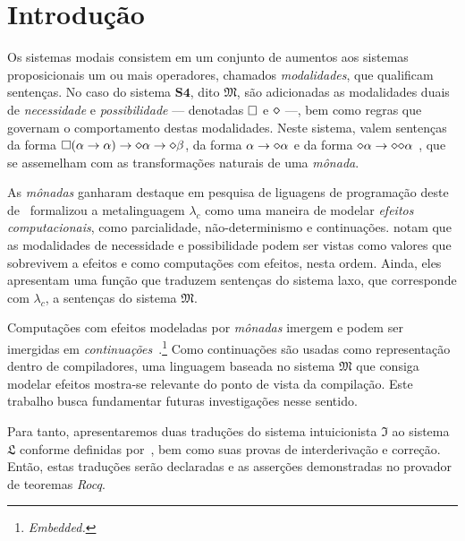 \chapter{Introdução}

    Os sistemas modais consistem em um conjunto de aumentos aos sistemas proposicionais um ou mais operadores, chamados \emph{modalidades}, que qualificam sentenças.
    No caso do sistema $\mathbf{S4}$, dito $\mathfrak{M}$, são adicionadas as modalidades duais de \emph{necessidade} e \emph{possibilidade} --- denotadas $\Box$ e $\pos$ ---, bem como regras que governam o comportamento destas modalidades.
    Neste sistema, valem sentenças da forma $\nec(\alpha\to\alpha)\to\pos\alpha\to\pos\beta$, da forma $\alpha\to\pos\alpha$ e da forma $\pos\alpha\to\pos\pos\alpha$ \citep{Zach+others.2024}, que se assemelham com as transformações naturais de uma \emph{mônada}.

    \vspace{.5\baselineskip}
    As \emph{mônadas} ganharam destaque em pesquisa de liguagens de programação deste de~\cite{Moggi.1991} formalizou a metalinguagem $\lambda_c$ como uma maneira de modelar \emph{efeitos computacionais}, como parcialidade, não-determinismo e continuações.
    \cite{Pfenning+Davies.2001} notam que as modalidades de necessidade e possibilidade podem ser vistas como valores que sobrevivem a efeitos e como computações com efeitos, nesta ordem.
    Ainda, eles apresentam uma função que traduzem sentenças do sistema laxo, que corresponde com $\lambda_c$, a sentenças do sistema $\mathfrak{M}$.

    \vspace{.5\baselineskip}
    Computações com efeitos modeladas por \emph{mônadas} imergem e podem ser imergidas em \emph{continuações}~\citep{Filinski.1994}.\footnote{\emph{Embedded.}}
    Como continuações são usadas como representação dentro de compiladores, uma linguagem baseada no sistema $\mathfrak{M}$ que consiga modelar efeitos mostra-se relevante do ponto de vista da compilação.
    Este trabalho busca fundamentar futuras investigações nesse sentido.

    \vspace{.5\baselineskip}
    Para tanto, apresentaremos duas traduções do sistema intuicionista $\mathfrak{I}$ ao sistema $\mathfrak{L}$ conforme definidas por~\cite{Troelstra+Schwichtenberg.2000}, bem como suas provas de interderivação e correção.
    Então, estas traduções serão declaradas e as asserções demonstradas no provador de teoremas \emph{Rocq}.

